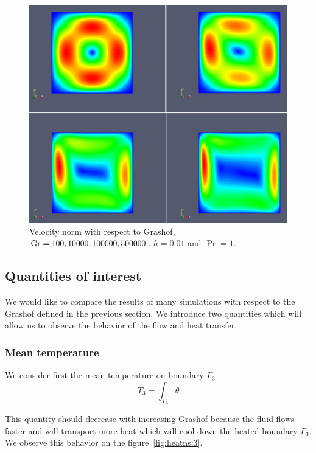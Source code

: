 \begin{figure}[htbp]
  \centering
  \includegraphics[width=.8\linewidth]{pngs/flow_grashof}
  \caption{Velocity norm with respect to  Grashof, $\mathrm{Gr}=100, 10000,
    100000, 500000$. $h=0.01$ and $\Pr=1$.}
  \label{fig:heatns:2}
\end{figure}

\subsection{Quantities of interest}
\label{sec:quant-du-benchm}

We would like to compare the results of many simulations with respect
to the Grashof defined in the previous section. We introduce two
quantities which will allow us to observe the behavior of the flow and
heat transfer.


\subsubsection{Mean temperature}
\label{sec:mean-temperature}

We consider first the mean temperature on boundary $\Gamma_3$
\begin{equation}
  \label{eq:16}
  T_3 = \int_{\Gamma_3} \theta
\end{equation}

This quantity should decrease with increasing Grashof because the
fluid flows faster and will transport more heat which will cool down
the heated boundary $\Gamma_3$. We observe this behavior on the
figure~\ref{fig:heatns:3}.

